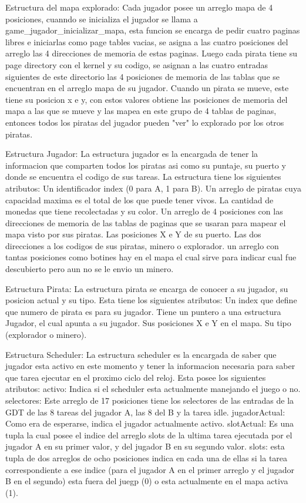 Estructura del mapa explorado:
  Cada jugador posee un arreglo mapa de 4 posiciones, cuanndo se inicializa el jugador se llama a game_jugador_inicializar_mapa,
  esta funcion se encarga de pedir cuatro paginas libres e iniciarlas como page tables vacias, se asigna a las cuatro posiciones
  del arreglo las 4 direcciones de memoria de estas paginas.
  Luego cada pirata tiene su page directory con el kernel y su codigo, se asignan a las cuatro entradas siguientes de este directorio
  las 4 posiciones de memoria de las tablas que se encuentran en el arreglo mapa de su jugador.
  Cuando un pirata se mueve, este tiene su posicion x e y, con estos valores obtiene las posiciones de memoria del mapa a las que se mueve
  y las mapea en este grupo de 4 tablas de paginas, entonces todos los piratas del jugador pueden "ver" lo explorado por los
  otros piratas.

  Estructura Jugador:
      La estructura jugador es la encargada de tener la informacion que comparten todos los piratas asi como
      su puntaje, su puerto y donde se encuentra el codigo de sus tareas.
      La estructura tiene los siguientes atributos:
        Un identificador index (0 para A, 1 para B).
        Un arreglo de piratas cuya capacidad maxima es el total de los que puede tener vivos.
        La cantidad de monedas que tiene recolectadas y su color.
        Un arreglo de 4 posiciones con las direcciones de memoria de las tablas de paginas que se usaran para mapear el mapa visto por
        sus piratas.
        Las posiciones X e Y de su puerto.
        Las dos direcciones a los codigos de sus piratas, minero o explorador.
        un arreglo con tantas posiciones como botines hay en el mapa el cual sirve para indicar cual fue descubierto pero aun no se le envio
        un minero.

  Estructura Pirata:
      La estructura pirata se encarga de conocer a su jugador, su posicion actual y su tipo.
      Esta tiene los siguientes atributos:
        Un index que define que numero de pirata es para su jugador.
        Tiene un puntero a una estructura Jugador, el cual apunta a su jugador.
        Sus posiciones X e Y en el mapa.
        Su tipo (explorador o minero).

  Estructura Scheduler:
      La estructura scheduler es la encargada de saber que jugador esta activo en este momento y tener la informacion
      necesaria para saber que tarea ejecutar en el proximo ciclo del reloj.
      Esta posee los siguientes atributos:
        activo: Indica si el scheduler esta actualmente manejando el juego o no.
        selectores: Este arreglo de 17 posiciones tiene los selectores de las entradas de la GDT de
        las 8 tareas del jugador A, las 8 del B y la tarea idle.
        jugadorActual: Como era de esperarse, indica el jugador actualmente activo.
        slotActual: Es una tupla la cual posee el indice del arreglo slots de la ultima tarea ejecutada por el jugador A
        en su primer valor, y del jugador B en su segundo valor.
        slots: esta tupla de dos arreglos de ocho posiciones indica en cada una de ellas si la tarea correspondiente a ese
        indice (para el jugador A en el primer arreglo y el jugador B en el segundo) esta fuera del juegp (0) o esta actualmente
        en el mapa activa (1).

